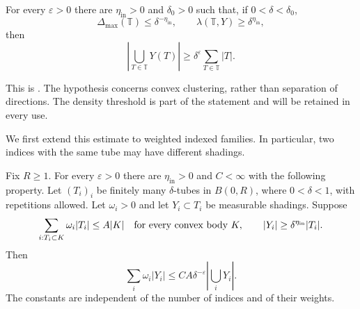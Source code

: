 \begin{theorem}\label{thm:set-input}
For every $\varepsilon>0$ there are $\eta_{\mathrm{in}}>0$ and $\delta_0>0$ such
that, if $0<\delta<\delta_0$,
\[
 \Delta_{\max}(\mathbb T)\le\delta^{-\eta_{\mathrm{in}}},
 \qquad \lambda(\mathbb T,Y)\ge\delta^{\eta_{\mathrm{in}}},
\]
then
\begin{equation}\label{eq:set-input}
 \left|\bigcup_{T\in\mathbb T}Y(T)\right|
 \ge\delta^\varepsilon\sum_{T\in\mathbb T}|T|.
\end{equation}
\end{theorem}

This is \citet[Theorem~1.1]{GWZ2026}. The hypothesis concerns convex
clustering, rather than separation of directions. The density
threshold is part of the statement and will be retained in every use.

We first extend this estimate to weighted indexed families. In particular,
two indices with the same tube may have different shadings.

\begin{lemma}\label{lem:weighted-convex-set}
Fix $R\ge1$. For every $\varepsilon>0$ there are
$\eta_{\mathrm{in}}>0$ and $C<\infty$ with the following property. Let $(T_i)_i$
be finitely many $\delta$-tubes in $B(0,R)$, where $0<\delta<1$,
with repetitions allowed. Let $\omega_i>0$ and let
$Y_i\subset T_i$ be measurable shadings. Suppose
\begin{equation}\label{eq:weighted-convex-hyp}
 \sum_{i:T_i\subset K}\omega_i|T_i|\le A|K|
 \quad\hbox{for every convex body }K,
 \qquad |Y_i|\ge\delta^{\eta_{\mathrm{in}}}|T_i|.
\end{equation}
Then
\begin{equation}\label{eq:weighted-convex-conclusion}
 \sum_i\omega_i|Y_i|
 \le C A\delta^{-\varepsilon}\left|\bigcup_iY_i\right|.
\end{equation}
The constants are independent of the number of indices and of their
weights.
\end{lemma}

